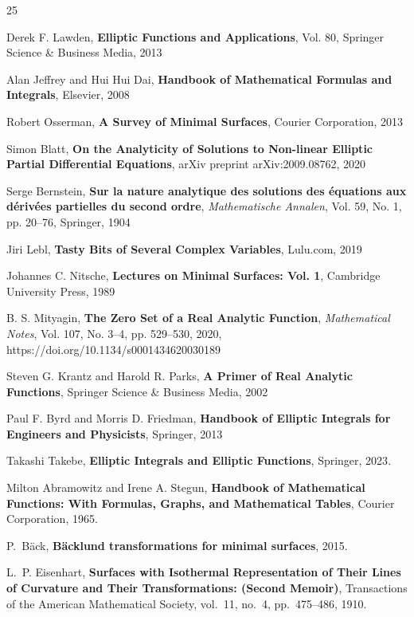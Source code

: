 \documentclass[12pt]{article}
\theoremstyle{plain}
\theoremstyle{definition}
\theoremstyle{remark}
\begin{document}
   
  \begin{thebibliography}{25}
   	
   	 Derek F. Lawden, \textbf{Elliptic Functions and Applications}{, Vol. 80, Springer Science \& Business Media, 2013}
   	
   	 Alan Jeffrey and Hui Hui Dai, \textbf{Handbook of Mathematical Formulas and Integrals}{, Elsevier, 2008}
   	
   	 Robert Osserman, \textbf{A Survey of Minimal Surfaces}{, Courier Corporation, 2013}
   	
   	 Simon Blatt, \textbf{On the Analyticity of Solutions to Non-linear Elliptic Partial Differential Equations}{, arXiv preprint arXiv:2009.08762, 2020}
   	
   	 Serge Bernstein, \textbf{Sur la nature analytique des solutions des équations aux dérivées partielles du second ordre}{, \textit{Mathematische Annalen}, Vol. 59, No. 1, pp. 20--76, Springer, 1904}
   	
   	 Jiri Lebl, \textbf{Tasty Bits of Several Complex Variables}{, Lulu.com, 2019}
   	
   	 Johannes C. Nitsche, \textbf{Lectures on Minimal Surfaces: Vol. 1}{, Cambridge University Press, 1989}
   	
   	 B. S. Mityagin, \textbf{The Zero Set of a Real Analytic Function}{, \textit{Mathematical Notes}, Vol. 107, No. 3--4, pp. 529--530, 2020, https://doi.org/10.1134/s0001434620030189}
   	
   	 Steven G. Krantz and Harold R. Parks, \textbf{A Primer of Real Analytic Functions}{, Springer Science \& Business Media, 2002}
   	
   	 Paul F. Byrd and Morris D. Friedman, \textbf{Handbook of Elliptic Integrals for Engineers and Physicists}{, Springer, 2013}
   	
   	 Takashi Takebe, \textbf{Elliptic Integrals and Elliptic Functions}{, Springer, 2023}.
   	
   	 Milton Abramowitz and Irene A. Stegun, \textbf{Handbook of Mathematical Functions: With Formulas, Graphs, and Mathematical Tables}, Courier Corporation, 1965.
   	
   	 P.~B{\"a}ck, \textbf{B{\"a}cklund transformations for minimal surfaces}, 2015.   	
   	
   	 L.~P. Eisenhart, \textbf{Surfaces with Isothermal Representation of Their Lines of Curvature and Their Transformations: (Second Memoir)}, Transactions of the American Mathematical Society, vol.~11, no.~4, pp.~475--486, 1910. 
   	

\end{thebibliography}
\end{document}
